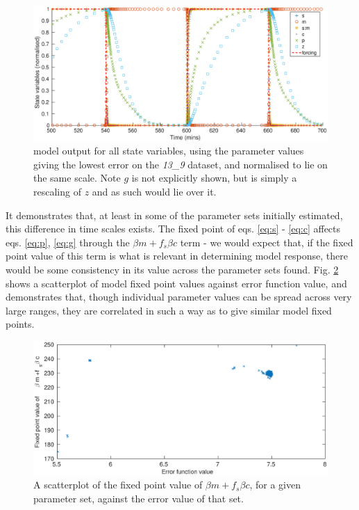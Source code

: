 \documentclass[10pt,journal]{./IEEE_latex_class/IEEEtran}
\begin{document}
\begin{figure}[h]	
    \centering
        \includegraphics[scale = 0.22]{model_output}
        \caption{model output for all state variables, using the parameter values giving the lowest error on the \textit{13\_9} dataset, and normalised to lie on the same scale. Note $g$ is not explicitly shown, but is simply a rescaling of $z$ and as such would lie over it. }
        \label{model_output} 
\end{figure}


It demonstrates that, at least in some of the parameter sets initially estimated, this difference in time scales exists. The fixed point of eqs. \ref{eq:s} - \ref{eq:c} affects eqs.  \ref{eq:p}, \ref{eq:g} through the $\beta m +f_{s}\beta c$ term - we would expect that, if the fixed point value of this term is what is relevant in determining model response, there would be some consistency in its value across the parameter sets found. Fig. \ref{fixedpoint_f} shows a scatterplot of model fixed point values against error function value, and demonstrates that, though individual parameter values can be spread across very large ranges, they are correlated in such a way as to give similar model fixed points. 

\begin{figure}[h]	
    \centering
        \includegraphics[scale = 0.25]{fixedpoint_f}
        \caption{A scatterplot of the fixed point value of $\beta m +f_{s}\beta c$, for a given parameter set, against the error value of that set. }
        \label{fixedpoint_f} 
\end{figure}
\end{document}

